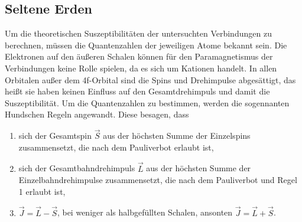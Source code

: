 \subsection{Seltene Erden}
Um die theoretischen Suszeptibilitäten der untersuchten Verbindungen zu berechnen, müssen die Quantenzahlen der jeweiligen Atome bekannt sein. Die Elektronen auf den äußeren Schalen können für den Paramagnetismus der Verbindungen keine Rolle spielen, da es sich um Kationen handelt. In allen Orbitalen außer dem 4f-Orbital sind die Spins und Drehimpulse abgesättigt, das heißt sie haben keinen Einfluss auf den Gesamtdrehimpuls und damit die Suszeptibilität. Um die Quantenzahlen zu bestimmen, werden die sogennanten Hundschen Regeln angewandt. Diese besagen, dass
\begin{enumerate}
  \item sich der Gesamtspin $\vec S$ aus der höchsten Summe der Einzelspins zusammensetzt, die nach dem Pauliverbot erlaubt ist,
  \item sich der Gesamtbahndrehimpuls $\vec L$ aus der höchsten Summe der Einzelbahndrehimpulse zusammensetzt, die nach dem Pauliverbot und Regel 1 erlaubt ist,
  \item $\vec J = \vec L - \vec S$, bei weniger als halbgefüllten Schalen, ansonten $\vec J = \vec L + \vec S$.
\end{enumerate}
